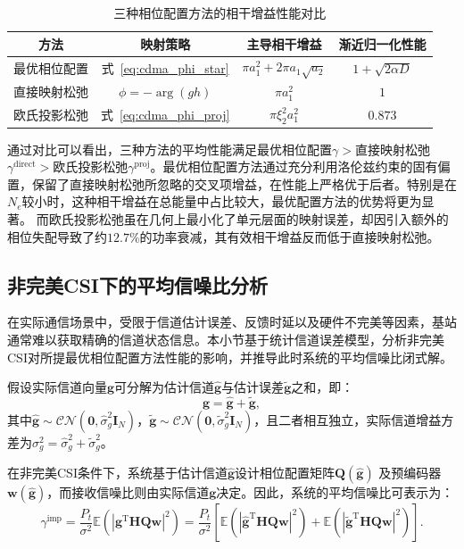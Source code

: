 \begin{table}[!htbp]
	\centering
	\caption{三种相位配置方法的相干增益性能对比}
	\label{tab:cdma_comparison}
	\begin{tabular}{cccc}
		\toprule
		\textbf{方法} & \textbf{映射策略} & \textbf{主导相干增益} & \textbf{渐近归一化性能} \\
		\midrule
		最优相位配置 & 式~\eqref{eq:cdma_phi_star} & $\pi a_1^2 + 2\pi a_1\sqrt{a_2}$ & $1+\sqrt{2\alpha D}$ \\
		直接映射松弛 & $\phi = -\arg(gh)$ & $\pi a_1^2$ & $1$ \\
		欧氏投影松弛 & 式~\eqref{eq:cdma_phi_proj} & $\pi \xi_2^2 a_1^2$ & $0.873$ \\
		\bottomrule
	\end{tabular}
\end{table}

通过对比可以看出，三种方法的平均性能满足最优相位配置$\gamma>$直接映射松弛$\gamma^{\mathrm{direct}}>$欧氏投影松弛$\gamma^{\mathrm{proj}}$。最优相位配置方法通过充分利用洛伦兹约束的固有偏置，保留了直接映射松弛所忽略的交叉项增益，在性能上严格优于后者。特别是在$N_e$较小时，这种相干增益在总能量中占比较大，最优配置方法的优势将更为显著。
而欧氏投影松弛虽在几何上最小化了单元层面的映射误差，却因引入额外的相位失配导致了约$12.7\%$的功率衰减，其有效相干增益反而低于直接映射松弛。


\subsection{非完美CSI下的平均信噪比分析}

在实际通信场景中，受限于信道估计误差、反馈时延以及硬件不完美等因素，基站通常难以获取精确的信道状态信息。本小节基于统计信道误差模型，分析非完美CSI对所提最优相位配置方法性能的影响，并推导此时系统的平均信噪比闭式解。

假设实际信道向量$\bm g$可分解为估计信道$\hat{\bm g}$与估计误差$\tilde{\bm g}$之和，即：
\begin{equation}\label{eq:cdma_channel_model_imp}
	\bm g = \hat{\bm g} + \tilde{\bm g},
\end{equation}
其中$\hat{\bm g} \sim \mathcal{CN}(\bm 0, \hat{\sigma}_g^2 \bm I_N)$，$\tilde{\bm g} \sim \mathcal{CN}(\bm 0, \tilde{\sigma}_g^2 \bm I_N)$，且二者相互独立，实际信道增益方差为$\sigma_g^2 = \hat{\sigma}_g^2 + \tilde{\sigma}_g^2$。

在非完美CSI条件下，系统基于估计信道$\hat{\bm g}$设计相位配置矩阵$\bm Q(\hat{\bm g})$ 及预编码器$\bm{w}(\hat{\bm{g}})$，而接收信噪比则由实际信道$\bm g$决定。因此，系统的平均信噪比可表示为：
\begin{equation}\label{eq:cdma_gamma_imp_def}
	\gamma^{\mathrm{imp}} = \frac{P_{t}}{\sigma^2}\mathbb{E}(\left| \bm g^\mathrm{T} \bm H \bm Q \bm w \right|^2)
	= \frac{P_{t}}{\sigma^2} \left[\mathbb{E}( \left| \bm{\hat{g}}^\mathrm{T} \bm H \bm Q \bm w \right|^2 )
	+ \mathbb{E}( \left| \bm{\tilde{g}}^\mathrm{T} \bm H \bm Q \bm w \right|^2 )\right].
\end{equation}

